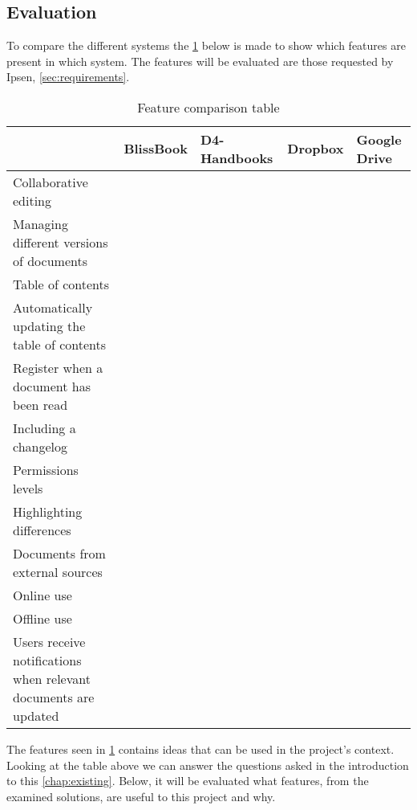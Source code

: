 \subsection{Evaluation}\label{sec:solutionsevaluation}
To compare the different systems the \cref{tab:Exsisting} below is made to show which features are present in which system.
The features will be evaluated are those requested by Ipsen, \cref{sec:requirements}.

\begin{table}[H]
	\begin{center}
		\begin{tabular}{| m{5cm}|m{1.6cm}|m{2cm}|m{1.5cm}|m{1.2cm}|}
			\hline
			& BlissBook  & D4-Handbooks & Dropbox & Google \newline Drive \\
			\hline
			Collaborative editing & \checkmark & & & \checkmark \\
			\hline
			Managing different versions of documents & \checkmark &  &  & \checkmark \\
			\hline
			Table of contents & \checkmark & \checkmark  & & \\
			\hline
			Automatically updating the table of contents & \checkmark & \checkmark  &  & \\
			\hline
			Register when a document has been read & \checkmark & \checkmark &  & \\
			\hline
			Including a changelog & \checkmark & \checkmark  &  & \\
			\hline
			Permissions levels & \checkmark &  & \checkmark & \checkmark \\
			\hline
			Highlighting differences & \checkmark &  &  & \checkmark\\
			\hline
			Documents from external \newline sources &  &  & \checkmark & \checkmark \\
			\hline
			Online use & \checkmark &  \checkmark & \checkmark  & \checkmark \\
			\hline
			Offline use & & \checkmark & \checkmark & \checkmark \\
			\hline
			Users receive notifications when relevant documents are updated & & \checkmark & & \\
			\hline
		\end{tabular}
		\caption{Feature comparison table}\label{tab:Exsisting}
	\end{center}
\end{table}

The features seen in \cref{tab:Exsisting} contains ideas that can be used in the project's context.
Looking at the table above we can answer the questions asked in the introduction to this \cref{chap:existing}.
Below, it will be evaluated what features, from the examined solutions, are useful to this project and why.

